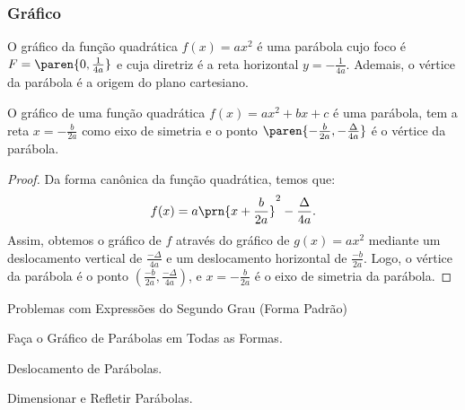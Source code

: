 \subsubsection{Gráfico}

\begin{example}
O gráfico da função quadrática $f(x) = ax^2$ é uma parábola cujo
foco é $F = \paren{0, \frac 1 {4a}}$ e cuja diretriz é a reta
horizontal $y = -\frac{1}{4a}$. Ademais, o vértice da parábola é a
origem do plano cartesiano.
\end{example}

\begin{proposition}
O gráfico de uma função quadrática $f(x) = ax^2 + bx + c$ é uma
parábola, tem a reta $x = -\frac {b}{2a}$ como eixo de simetria e o
ponto $\paren{-\frac {b} {2a}, -\frac {\Delta} {4a}}$ é o vértice da
parábola.
\end{proposition}

\begin{proof}
    Da forma canônica da função quadrática, temos que:
    \[
        f(x) = a\prn{x+\frac b {2a}}^2 - \frac{\Delta}{4a}.
    \]
    \noindent Assim, obtemos o gráfico de $f$ através do gráfico de $g(x) = ax^2$
    mediante um deslocamento vertical de $\frac{-\Delta}{4a}$ e um deslocamento
    horizontal de $\frac{-b}{2a}$.
    Logo, o vértice da parábola é o ponto $(\frac{-b}{2a}, \frac{-\Delta}{4a})$, e 
    $x=-\frac{b}{2a}$ é o eixo de simetria da parábola.
\end{proof}

\begin{onlineact}
{Problemas com Expressões do Segundo Grau (Forma Padrão)}
\end{onlineact}

\begin{onlineact}
{Faça o Gráfico de Parábolas em Todas as Formas}.
\end{onlineact}

\begin{onlineact}
{Deslocamento de Parábolas}.
\end{onlineact}

\begin{onlineact}
{Dimensionar e Refletir Parábolas}.
\end{onlineact}